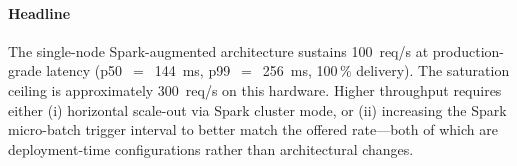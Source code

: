 \paragraph{Headline} The single-node Spark-augmented architecture
sustains 100~req/s at production-grade latency
(p50~$=$~144~ms, p99~$=$~256~ms, 100\,\% delivery). The saturation
ceiling is approximately 300~req/s on this hardware. Higher
throughput requires either (i) horizontal scale-out via Spark
cluster mode, or (ii) increasing the Spark micro-batch trigger
interval to better match the offered rate—both of which are
deployment-time configurations rather than architectural changes.
